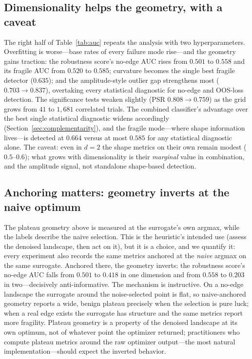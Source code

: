 \documentclass[11pt]{article}
\begin{document}
\subsection{Dimensionality helps the geometry, with a caveat}
\label{sec:dimension}

The right half of Table~\ref{tab:auc} repeats the analysis with two
hyperparameters. Overfitting is worse---base rates of every failure mode
rise---and the geometry gains traction: the robustness score's no-edge AUC rises
from $0.501$ to $0.558$ and its fragile AUC from $0.520$ to $0.585$; curvature
becomes the single best fragile detector ($0.635$); and the amplitude-style
outlier gap strengthens most ($0.703 \to 0.837$), overtaking every statistical
diagnostic for no-edge and OOS-loss detection. The significance tests weaken
slightly (PSR $0.808 \to 0.759$) as the grid grows from $41$ to $1{,}681$
correlated trials. The combined classifier's advantage over the best single
statistical diagnostic widens accordingly (Section~\ref{sec:complementarity}),
and the fragile mode---where shape information lives---is detected at $0.664$
versus at most $0.585$ for any statistical diagnostic alone. The caveat: even in
$d{=}2$ the shape metrics on their own remain modest ($0.5$--$0.6$); what grows
with dimensionality is their \emph{marginal} value in combination, and the
amplitude signal, not standalone shape-based detection.

\subsection{Anchoring matters: geometry inverts at the naive optimum}
\label{sec:anchoring}

The plateau geometry above is measured at the surrogate's own argmax, while the
labels describe the naive selection. This is the heuristic's intended use
(assess the denoised landscape, then act on it), but it is a choice, and we
quantify it: every experiment also records the same metrics anchored at the
\emph{naive} argmax on the same surrogate. Anchored there, the geometry
inverts: the robustness score's no-edge AUC falls from $0.501$ to $0.418$ in one
dimension and from $0.558$ to $0.203$ in two---decisively anti-informative. The
mechanism is instructive. On a no-edge landscape the surrogate around the
noise-selected point is flat, so naive-anchored geometry reports a wide, benign
plateau precisely when the selection is pure luck; when a real edge exists the
surrogate has structure and the same metrics report more fragility. Plateau
geometry is a property of the denoised landscape at its own optimum, not of
whatever point the optimizer returned; practitioners who compute plateau metrics
around the raw optimizer output---the most natural implementation---should
expect the inverted behavior.
\end{document}
